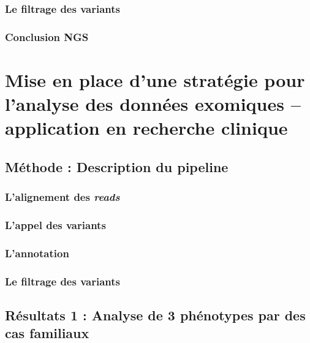 \documentclass[12pt,twoside]{ugathesis}
\begin{document}
\subsection{Le filtrage des variants}\label{le-filtrage-des-variants}

\subsection{Conclusion NGS}\label{conclusion-ngs}

\chapter{Mise en place d'une stratégie pour l'analyse des données
exomiques -- application en recherche
clinique}\label{mise-en-place-dune-strategie-pour-lanalyse-des-donnees-exomiques-application-en-recherche-clinique}

\section{Méthode : Description du
pipeline}\label{methode-description-du-pipeline}

\subsection{\texorpdfstring{L'alignement des
\emph{reads}}{L'alignement des reads}}\label{lalignement-des-reads}

\subsection{L'appel des variants}\label{lappel-des-variants}

\subsection{L'annotation}\label{lannotation}

\subsection{Le filtrage des variants}\label{le-filtrage-des-variants-1}

\section{Résultats 1 : Analyse de 3 phénotypes par des cas
familiaux}\label{resultats-1-analyse-de-3-phenotypes-par-des-cas-familiaux}
\end{document}
